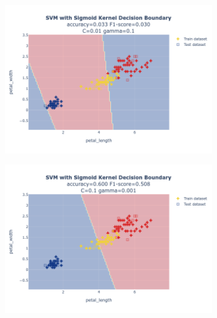 \documentclass{article}
\begin{document}
\begin{figure}
\begin{subfigure}{0.3\textwidth}
        \includegraphics[scale=.13]{images/implementation/q1/sigmoid_kernel/petal_length_petal_width_0.01_0.1.png}
    \end{subfigure}
    \newline
    \begin{subfigure}{0.3\textwidth}
        \centering
        \includegraphics[scale=.13]{images/implementation/q1/sigmoid_kernel/petal_length_petal_width_0.1_0.001.png}
    \end{subfigure}
    \hfill
    \begin{subfigure}{0.3\textwidth}
        \centering

\end{subfigure}
\end{figure}
\end{document}

